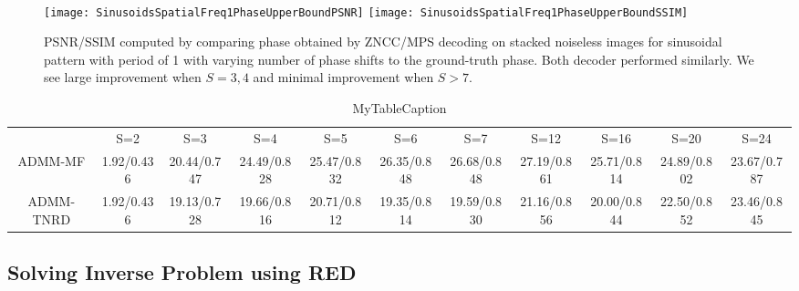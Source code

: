 \documentclass[../writeup.tex]{subfiles}
\begin{document}
\paragraph{}

\begin{figure}[h!]
    \begin{center}
        \texttt{[image: SinusoidsSpatialFreq1PhaseUpperBoundPSNR]}
        \texttt{[image: SinusoidsSpatialFreq1PhaseUpperBoundSSIM]}
        \caption{PSNR/SSIM computed by comparing phase obtained by ZNCC/MPS decoding on stacked noiseless images for sinusoidal pattern with period of 1 with varying number of phase shifts to the ground-truth phase. Both decoder performed similarly. We see large improvement when $S=3,4$ and minimal improvement when $S>7$.}
        \label{fig:sinusiods_spatial_freq_1_phase_upper_bound_wrt_S}
    \end{center}
\end{figure}  
 

 \begin{table}
    \centering
    \begin{tabular}{c|cccccccccc}
    \hline
     & S=2 & S=3 & S=4 & S=5 & S=6 & S=7 & S=12 & S=16 & S=20 & S=24 \\
    ADMM-MF & 1.92/0.436 & 20.44/0.747 & 24.49/0.828 & 25.47/0.832 & 26.35/0.848 & 26.68/0.848 & 27.19/0.861 & 25.71/0.814 & 24.89/0.802 & 23.67/0.787 \\
    ADMM-TNRD & 1.92/0.436 & 19.13/0.728 & 19.66/0.816 & 20.71/0.812 & 19.35/0.814 & 19.59/0.830 & 21.16/0.856 & 20.00/0.844 & 22.50/0.852 & 23.46/0.845 \\
    \end{tabular}
    \caption{MyTableCaption}
    \label{table:MyTableLabel}
\end{table}

\subsection{Solving Inverse Problem using RED}
\end{document}

